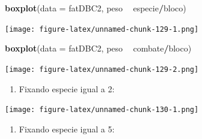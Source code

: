 \documentclass[
]{article}
\newenvironment{Shaded}{\begin{snugshade}}{\end{snugshade}}
\newcommand{\DataTypeTok}[1]{\textcolor[rgb]{0.13,0.29,0.53}{#1}}
\newcommand{\DecValTok}[1]{\textcolor[rgb]{0.00,0.00,0.81}{#1}}
\newcommand{\KeywordTok}[1]{\textcolor[rgb]{0.13,0.29,0.53}{\textbf{#1}}}
\newcommand{\NormalTok}[1]{#1}
\newcommand{\OperatorTok}[1]{\textcolor[rgb]{0.81,0.36,0.00}{\textbf{#1}}}
\newcommand{\StringTok}[1]{\textcolor[rgb]{0.31,0.60,0.02}{#1}}
\providecommand{\tightlist}{%
  \setlength{\itemsep}{0pt}\setlength{\parskip}{0pt}}
\begin{document}
\begin{Shaded}
\begin{Highlighting}[]
\KeywordTok{boxplot}\NormalTok{(}\DataTypeTok{data =}\NormalTok{ fatDBC2, peso }\OperatorTok{~}\StringTok{ }\NormalTok{especie}\OperatorTok{/}\NormalTok{bloco)}
\end{Highlighting}
\end{Shaded}

\texttt{[image: figure-latex/unnamed-chunk-129-1.png]}

\begin{Shaded}
\begin{Highlighting}[]
\KeywordTok{boxplot}\NormalTok{(}\DataTypeTok{data =}\NormalTok{ fatDBC2, peso }\OperatorTok{~}\StringTok{ }\NormalTok{combate}\OperatorTok{/}\NormalTok{bloco)}
\end{Highlighting}
\end{Shaded}

\texttt{[image: figure-latex/unnamed-chunk-129-2.png]}

\begin{enumerate}
\def\labelenumi{\arabic{enumi}.}
\setcounter{enumi}{4}
\tightlist
\item
  Fixando especie igual a 2:
\end{enumerate}

\begin{Shaded}
\end{Shaded}

\texttt{[image: figure-latex/unnamed-chunk-130-1.png]}

\begin{enumerate}
\def\labelenumi{\arabic{enumi}.}
\setcounter{enumi}{5}
\tightlist
\item
  Fixando especie igual a 5:
\end{enumerate}

\begin{Shaded}
\end{Shaded}
\end{document}

